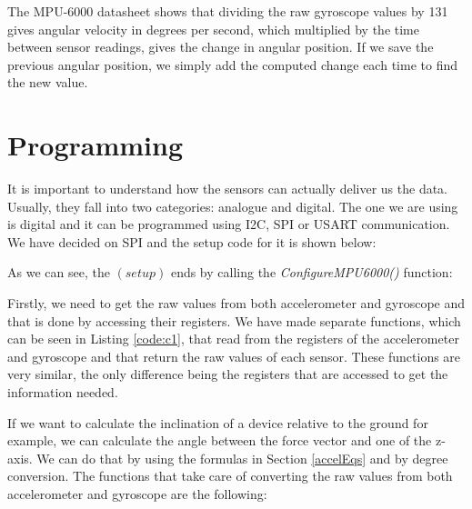 The MPU-6000 datasheet\cite{MPU6000} shows that dividing the raw gyroscope values by 131 gives angular velocity in degrees per second, which multiplied by the time between sensor readings, gives the change in angular position. If we save the previous angular position, we simply add the computed change each time to find the new value.


\section{Programming}
It is important to understand how the sensors can actually deliver us the data. Usually, they fall into two categories: analogue and digital. The one we are using is digital and it can be programmed using I2C, SPI or USART communication. We have decided on SPI and the setup code for it is shown below:



As we can see, the $(setup)$ ends by calling the \textit{ConfigureMPU6000()} function:



Firstly, we need to get the raw values from both accelerometer and gyroscope and that is done by accessing their registers. We have made separate functions, which can be seen in Listing \ref{code:c1}, that read from the registers of the accelerometer and gyroscope and that return the raw values of each sensor. These functions are very similar, the only difference being the registers that are accessed to get the information needed. 



If we want to calculate the inclination of a device relative to the ground for example, we can calculate the angle between the force vector and one of the z-axis. We can do that by using the formulas in Section \ref{accelEqs} and by degree conversion. The functions that take care of converting the raw values from both accelerometer and gyroscope are the following:



